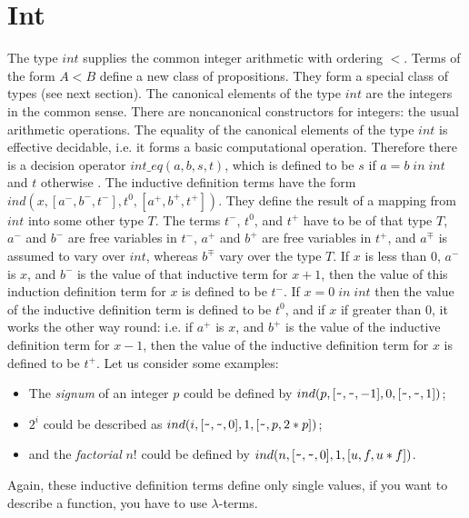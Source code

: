 \documentclass[11pt]{report}
\newcommand{\inv}[1]{\index{#1}}
\begin{document}
 \section{Int}
 \inv{int type}
 The type $int$ supplies the common integer arithmetic with
 ordering $<$. Terms of the form $A$$<$$B$ 
 define a new class of propositions. They form a
 special class of types (see next section).
 The canonical elements of the type $int$ are the integers
 in the common sense. 
 There are noncanonical constructors for integers: the usual
 arithmetic operations.
 The equality of the canonical elements of the type $int$
 is effective decidable, i.e. it forms a basic computational
 operation. Therefore there is a decision operator $int\_eq(a,b,s,t)$,
 which is defined to be $s$ if $a=b\;in\;int$ and $t$ otherwise .
 The inductive definition terms have the form 
 $ind(x,[a^-,b^-,t^-],t^0,[a^+,b^+,t^+])$. They define the 
 result of a mapping from $int$ into some other type $T$. 
 The terms $t^-$, $t^0$, and $t^+$ have to be of that type $T$,
 $a^-$ and $b^-$ are free variables in $t^-$,
 $a^+$ and $b^+$ are free variables in $t^+$, 
 and $a^\mp$ is assumed to vary over $int$, 
 whereas $b^\mp$ vary over the type $T$.
 If $x$ is less than $0$, $a^-$ is $x$,
 and $b^-$ is the value of that inductive term for $x+1$, then the
 value of this induction definition term for $x$ is defined to be $t^-$.
 If $x=0 \; in\; int$ then the value of the inductive definition term
 is defined to be $t^0$, and if $x$ if greater than $0$, it works
 the other way round: i.e. if $a^+$ is $x$, and $b^+$ is the
 value of the inductive definition term for $x-1$, 
 then the value of the inductive definition term for $x$ is defined
 to be $t^+$. Let us consider some examples:
 \begin{itemize}
 \item
 The \emph{signum} of an integer $p$ could be defined by 
 $ind(p,[\verb'~',\verb'~',-1],0,[\verb'~',\verb'~',1])$;
 \item
 $2^i$ could be described as
 $ind(i,[\verb'~',\verb'~',0],1,[\verb'~',p,2*p])$;
 \item
 and the \emph{factorial} $n!$ could be defined by
 $ind(n,[\verb'~',\verb'~',0],1,[u,f,u*f])$. 
 \end{itemize}
 Again, these inductive definition terms define only single values,
 if you want to describe a function, you have to use $\lambda$-terms.
  
\end{document}

